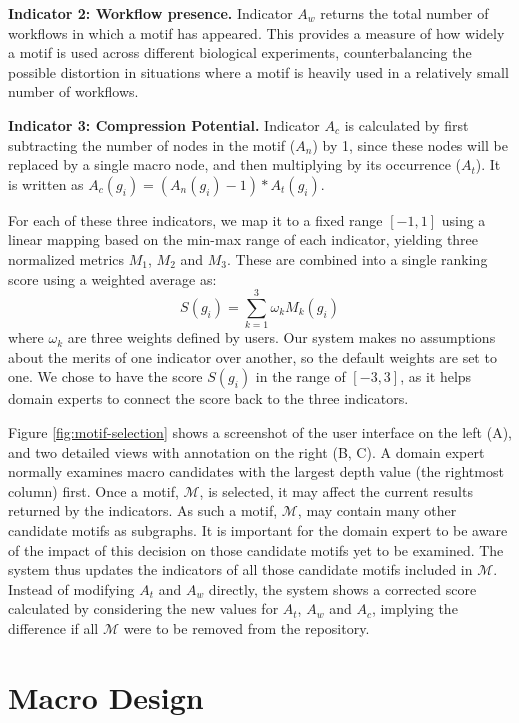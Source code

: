 \noindent \textbf{Indicator 2: Workflow presence.} Indicator $A_w$ returns the total number of workflows in which a motif has appeared.
This provides a measure of how widely a motif is used across different biological experiments, counterbalancing the possible distortion in situations where a motif is heavily used in a relatively small number of workflows. 

\noindent \textbf{Indicator 3: Compression Potential.} Indicator $A_c$ is calculated by first subtracting the number of nodes in the motif ($A_n$) by 1, since these nodes will be replaced by a single macro node, and then multiplying by its occurrence ($A_t$).
It is written as $A_c(g_i) = (A_n(g_i) - 1) * A_t(g_i)$.

For each of these three indicators, we map it to a fixed range $[-1, 1]$ using a linear mapping based on the min-max range of each indicator, yielding three normalized metrics $M_1$, $M_2$ and $M_3$.
These are combined into a single ranking score using a weighted average as:
\[
S(g_i) = \sum_{k=1}^3 \omega_k M_k(g_i)
\]
\noindent where $\omega_k$ are three weights defined by users.
Our system makes no assumptions about the merits of one indicator over another, so the default weights are set to one.
We chose to have the score $S(g_i)$ in the range of $[-3, 3]$, as it helps domain experts to connect the score back to the three indicators.

Figure \ref{fig:motif-selection} shows a screenshot of the user interface on the left (A), and two detailed views with annotation on the right (B, C).
A domain expert normally examines macro candidates with the largest depth value (the rightmost column) first.
Once a motif, $\mathcal{M}$, is selected, it may affect the current results returned by the indicators.
As such a motif, $\mathcal{M}$, may contain many other candidate motifs as subgraphs. It is important for the domain expert to be aware of the impact of this decision on those candidate motifs yet to be examined.
The system thus updates the indicators of all those candidate motifs included in $\mathcal{M}$.
Instead of modifying $A_t$ and $A_w$ directly, the system shows a corrected score calculated by considering the new values for $A_t$, $A_w$ and $A_c$, implying the difference if all $\mathcal{M}$ were to be removed from the repository.

\section{Macro Design}
\label{sec:Design}

